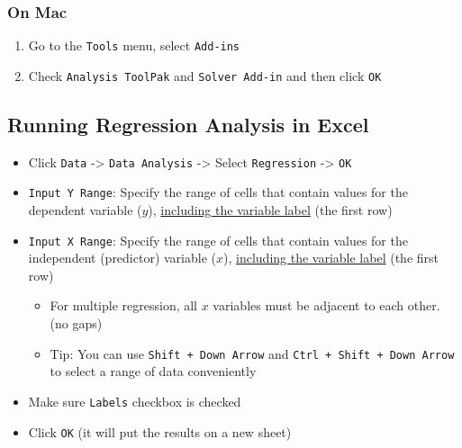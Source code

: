 \documentclass[10pt,article]{article}
\begin{document}
\subsubsection{On Mac}
\label{sec:orgdfaee7f}
\begin{enumerate}
\item Go to the \texttt{Tools} menu, select \texttt{Add-ins}
\item Check \texttt{Analysis ToolPak} and \texttt{Solver Add-in} and then click \texttt{OK}
\end{enumerate}
\subsection{Running Regression Analysis in Excel}
\label{sec:org261235a}
\begin{itemize}
\item Click \texttt{Data} -> \texttt{Data Analysis} -> Select \texttt{Regression} -> \texttt{OK}

\item \texttt{Input Y Range}: Specify the range of cells that contain values for the
dependent variable (\(y\)), \uline{including the variable label} (the first row)

\item \texttt{Input X Range}: Specify the range of cells that contain values for the
independent (predictor) variable (\(x\)), \uline{including the variable label}
(the first row)

\begin{itemize}
\item For multiple regression, all \(x\) variables must be adjacent to each other. (no gaps)

\item Tip: You can use \texttt{Shift + Down Arrow} and \texttt{Ctrl + Shift + Down Arrow} to
select a range of data conveniently
\end{itemize}

\item Make sure \texttt{Labels} checkbox is checked
\item Click \texttt{OK} (it will put the results on a new sheet)
\end{itemize}
\end{document}
